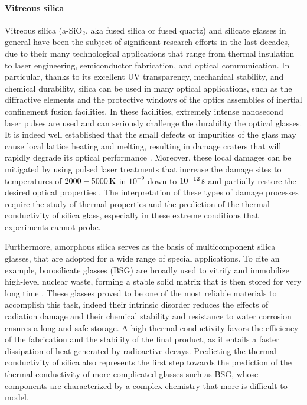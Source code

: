 \paragraph{Vitreous silica}
Vitreous silica (a-SiO$_2$, aka fused silica or fused quartz) and silicate glasses in general have been the subject of significant research efforts in the last decades, due to their many technological applications that range from thermal insulation to laser engineering, semiconductor fabrication, and optical communication.
In particular, thanks to its excellent UV transparency, mechanical stability, and chemical durability, silica can be used in many optical applications, such as the diffractive elements and the protective windows of the optics assemblies of inertial confinement fusion facilities. In these facilities, extremely intense nanosecond laser pulses are used and can seriously challenge the durability the optical glasses. It is indeed well established that the small defects or impurities of the glass may cause local lattice heating and melting, resulting in damage craters that will rapidly degrade its optical performance \cite{Miller2004,Canaud2004,Miller2010,Chambonneau2014,Kuzuu1999,Stuart1995,Wong2006,Carr2010,Saito2000}. Moreover, these local damages can be mitigated by using pulsed laser treatments that increase the damage sites to temperatures of $2000-5000\,\mathrm{K}$ in $10^{-9}$ down to $10^{-12}\,\mathrm{s}$ and partially restore the desired optical properties \cite{Soules2011}. 
The interpretation of these types of damage processes require the study of thermal properties and the prediction of the thermal conductivity of silica glass, especially in these extreme conditions that experiments cannot probe.

Furthermore, amorphous silica serves as the basis of multicomponent silica glasses, that are adopted for a wide range of special applications. 
To cite an example, borosilicate glasses (BSG) are broadly used to vitrify and immobilize high-level nuclear waste, forming a stable solid matrix that is then stored for very long time \cite{OjovanBook13}. These glasses proved to be one of the most reliable materials to accomplish this task, indeed their intrinsic disorder reduces the effects of radiation damage and their chemical stability and resistance to water corrosion ensures a long and safe storage. A high thermal conductivity favors the efficiency of the fabrication and the stability of the final product, as it entails a faster dissipation of heat generated by radioactive decays. 
Predicting the thermal conductivity of silica also represents the first step towards the prediction of the thermal conductivity of more complicated glasses such as BSG, whose components are characterized by a complex chemistry that more is difficult to model. 

